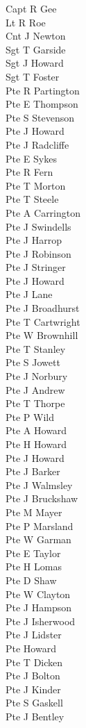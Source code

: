 \begin{multicols}{2}
  \small
  \noindent
  Capt R Gee \\
  Lt R Roe \\
  Cnt J Newton \\
  Sgt T Garside \\
  Sgt J Howard \\
  Sgt T Foster \\
  Pte R Partington \\
  Pte E Thompson \\
  Pte S Stevenson \\
  Pte J Howard \\
  Pte J Radcliffe \\
  Pte E Sykes \\
  Pte R Fern \\
  Pte T Morton \\
  Pte T Steele \\
  Pte A Carrington \\
  Pte J Swindells \\
  Pte J Harrop \\
  Pte J Robinson \\
  Pte J Stringer \\
  Pte J Howard \\
  Pte J Lane \\
  Pte J Broadhurst \\
  Pte T Cartwright \\
  Pte W Brownhill \\
  Pte T Stanley \\
  Pte S Jowett \\
  Pte J Norbury \\
  Pte J Andrew \\
  Pte T Thorpe \\
  Pte P Wild \\
  Pte A Howard \\
  Pte H Howard \\
  Pte J Howard \\
  Pte J Barker \\
  Pte J Walmsley \\
  Pte J Bruckshaw \\
  Pte M Mayer \\
  Pte P Marsland \\
  Pte W Garman \\
  Pte E Taylor \\
  Pte H Lomas \\
  Pte D Shaw \\
  Pte W Clayton \\
  Pte J Hampson \\
  Pte J Isherwood \\
  Pte J Lidster \\
  Pte Howard \\
  Pte T Dicken \\
  Pte J Bolton \\
  Pte J Kinder \\
  Pte S Gaskell \\
  Pte J Bentley \\
\end{multicols}
